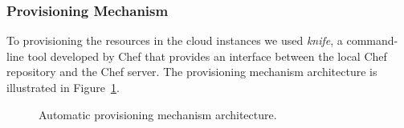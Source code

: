 \pagebreak

\subsubsection{Provisioning Mechanism}
\label{subs:provisioning_mechanism}
To provisioning the resources in the cloud instances we used \textit{knife}, a command-line tool
developed by Chef that provides an interface between the local Chef repository and the Chef server.
The provisioning mechanism architecture is illustrated in Figure~\ref{fig:provisioning_tech_architecture}.\\

\begin{figure}[ht!]
\centering
{}%
\caption[Provisioning mechanism architecture.]{Automatic provisioning mechanism architecture.}
\label{fig:provisioning_tech_architecture}
\end{figure}

